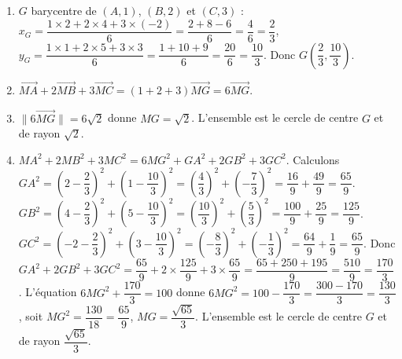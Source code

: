 \begin{enumerate}[label=\arabic*)]
\item $G$ barycentre de $(A,1)$, $(B,2)$ et $(C,3)$ : $x_G = \dfrac{1\times 2 + 2\times 4 + 3\times (-2)}{6} = \dfrac{2 + 8 - 6}{6} = \dfrac{4}{6} = \dfrac{2}{3}$, $y_G = \dfrac{1\times 1 + 2\times 5 + 3\times 3}{6} = \dfrac{1 + 10 + 9}{6} = \dfrac{20}{6} = \dfrac{10}{3}$. Donc $G\left(\dfrac{2}{3},\dfrac{10}{3}\right)$.
\item $\overrightarrow{MA} + 2\overrightarrow{MB} + 3\overrightarrow{MC} = (1+2+3)\overrightarrow{MG} = 6\overrightarrow{MG}$.
\item $\|6\overrightarrow{MG}\| = 6\sqrt{2}$ donne $MG = \sqrt{2}$. L'ensemble est le cercle de centre $G$ et de rayon $\sqrt{2}$.
\item $MA^2 + 2MB^2 + 3MC^2 = 6MG^2 + GA^2 + 2GB^2 + 3GC^2$. Calculons $GA^2 = \left(2-\dfrac{2}{3}\right)^2 + \left(1-\dfrac{10}{3}\right)^2 = \left(\dfrac{4}{3}\right)^2 + \left(-\dfrac{7}{3}\right)^2 = \dfrac{16}{9} + \dfrac{49}{9} = \dfrac{65}{9}$. $GB^2 = \left(4-\dfrac{2}{3}\right)^2 + \left(5-\dfrac{10}{3}\right)^2 = \left(\dfrac{10}{3}\right)^2 + \left(\dfrac{5}{3}\right)^2 = \dfrac{100}{9} + \dfrac{25}{9} = \dfrac{125}{9}$. $GC^2 = \left(-2-\dfrac{2}{3}\right)^2 + \left(3-\dfrac{10}{3}\right)^2 = \left(-\dfrac{8}{3}\right)^2 + \left(-\dfrac{1}{3}\right)^2 = \dfrac{64}{9} + \dfrac{1}{9} = \dfrac{65}{9}$. Donc $GA^2 + 2GB^2 + 3GC^2 = \dfrac{65}{9} + 2\times\dfrac{125}{9} + 3\times\dfrac{65}{9} = \dfrac{65 + 250 + 195}{9} = \dfrac{510}{9} = \dfrac{170}{3}$. L'équation $6MG^2 + \dfrac{170}{3} = 100$ donne $6MG^2 = 100 - \dfrac{170}{3} = \dfrac{300 - 170}{3} = \dfrac{130}{3}$, soit $MG^2 = \dfrac{130}{18} = \dfrac{65}{9}$, $MG = \dfrac{\sqrt{65}}{3}$. L'ensemble est le cercle de centre $G$ et de rayon $\dfrac{\sqrt{65}}{3}$.
\end{enumerate}

